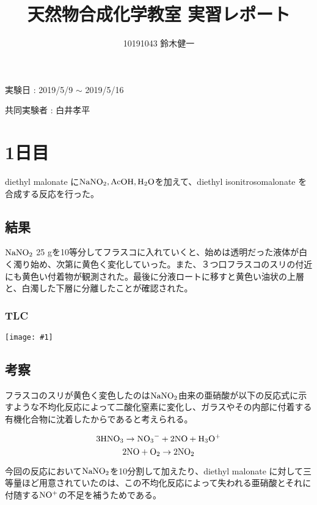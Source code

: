 \documentclass[a4paper,papersize,dvipdfmx]{jsarticle}
\newcommand{\pict}[2]{\begin{center} \texttt{[image: \#1]} \end{center}}   %
\begin{document}
\title{天然物合成化学教室 実習レポート}
\author{10191043 鈴木健一}
\date{}
\maketitle


\begin{flushright}
実験日 : 2019/5/9 $\sim$ 2019/5/16

共同実験者 : 白井孝平
\end{flushright}

\section*{1日目}
diethyl malonate に$\rm{NaNO_2, AcOH, H_2O}$を加えて、diethyl isonitrosomalonate を合成する反応を行った。


\subsection*{結果}
$\rm NaNO_2$ 25 gを10等分してフラスコに入れていくと、始めは透明だった液体が白く濁り始め、次第に黄色く変化していった。また、３つ口フラスコのスリの付近にも黄色い付着物が観測された。最後に分液ロートに移すと黄色い油状の上層と、白濁した下層に分離したことが確認された。

\subsubsection*{TLC}

\pict{imgs1/tlc.jpeg}{6}

\subsection*{考察}

フラスコのスリが黄色く変色したのは$\rm NaNO_2$由来の亜硝酸が以下の反応式に示すような不均化反応によって二酸化窒素に変化し、ガラスやその内部に付着する有機化合物に沈着したからであると考えられる。

\[\rm 3HNO_3 \rightarrow N{O_3}^- + 2NO + H_3O^+\]
\[\rm 2NO + O_2 \rightarrow 2NO_2\]

今回の反応において$\rm NaNO_2$を10分割して加えたり、diethyl malonate に対して三等量ほど用意されていたのは、この不均化反応によって失われる亜硝酸とそれに付随する$\rm NO^+$の不足を補うためである。
\end{document}
